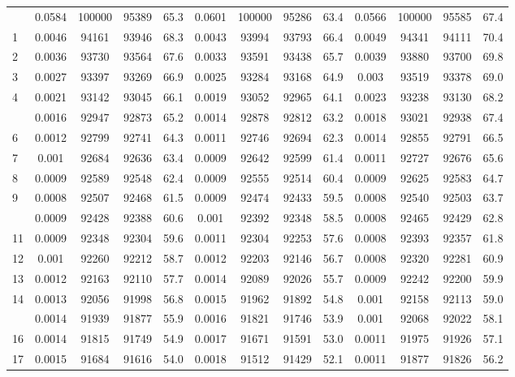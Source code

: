 \documentclass[
  14pt,
]{article}
\begin{document}
\begin{longtable}[t]{lcccccccccccc}
\endfoot
\bottomrule
\endlastfoot
0 & 0.0584 & 100000 & 95389 & 65.3 & 0.0601 & 100000 & 95286 & 63.4 & 0.0566 & 100000 & 95585 & 67.4\\
1 & 0.0046 & 94161 & 93946 & 68.3 & 0.0043 & 93994 & 93793 & 66.4 & 0.0049 & 94341 & 94111 & 70.4\\
2 & 0.0036 & 93730 & 93564 & 67.6 & 0.0033 & 93591 & 93438 & 65.7 & 0.0039 & 93880 & 93700 & 69.8\\
3 & 0.0027 & 93397 & 93269 & 66.9 & 0.0025 & 93284 & 93168 & 64.9 & 0.003 & 93519 & 93378 & 69.0\\
4 & 0.0021 & 93142 & 93045 & 66.1 & 0.0019 & 93052 & 92965 & 64.1 & 0.0023 & 93238 & 93130 & 68.2\\
\addlinespace
5 & 0.0016 & 92947 & 92873 & 65.2 & 0.0014 & 92878 & 92812 & 63.2 & 0.0018 & 93021 & 92938 & 67.4\\
6 & 0.0012 & 92799 & 92741 & 64.3 & 0.0011 & 92746 & 92694 & 62.3 & 0.0014 & 92855 & 92791 & 66.5\\
7 & 0.001 & 92684 & 92636 & 63.4 & 0.0009 & 92642 & 92599 & 61.4 & 0.0011 & 92727 & 92676 & 65.6\\
8 & 0.0009 & 92589 & 92548 & 62.4 & 0.0009 & 92555 & 92514 & 60.4 & 0.0009 & 92625 & 92583 & 64.7\\
9 & 0.0008 & 92507 & 92468 & 61.5 & 0.0009 & 92474 & 92433 & 59.5 & 0.0008 & 92540 & 92503 & 63.7\\
\addlinespace
10 & 0.0009 & 92428 & 92388 & 60.6 & 0.001 & 92392 & 92348 & 58.5 & 0.0008 & 92465 & 92429 & 62.8\\
11 & 0.0009 & 92348 & 92304 & 59.6 & 0.0011 & 92304 & 92253 & 57.6 & 0.0008 & 92393 & 92357 & 61.8\\
12 & 0.001 & 92260 & 92212 & 58.7 & 0.0012 & 92203 & 92146 & 56.7 & 0.0008 & 92320 & 92281 & 60.9\\
13 & 0.0012 & 92163 & 92110 & 57.7 & 0.0014 & 92089 & 92026 & 55.7 & 0.0009 & 92242 & 92200 & 59.9\\
14 & 0.0013 & 92056 & 91998 & 56.8 & 0.0015 & 91962 & 91892 & 54.8 & 0.001 & 92158 & 92113 & 59.0\\
\addlinespace
15 & 0.0014 & 91939 & 91877 & 55.9 & 0.0016 & 91821 & 91746 & 53.9 & 0.001 & 92068 & 92022 & 58.1\\
16 & 0.0014 & 91815 & 91749 & 54.9 & 0.0017 & 91671 & 91591 & 53.0 & 0.0011 & 91975 & 91926 & 57.1\\
17 & 0.0015 & 91684 & 91616 & 54.0 & 0.0018 & 91512 & 91429 & 52.1 & 0.0011 & 91877 & 91826 & 56.2\\

\end{longtable}
\end{document}
